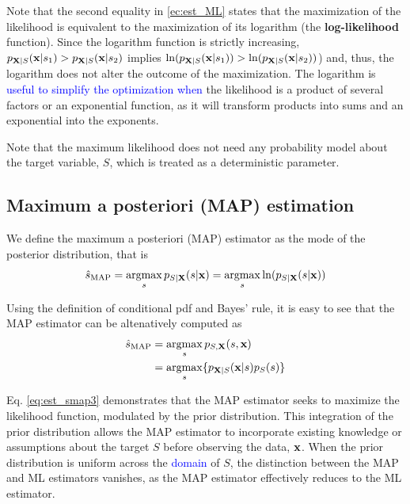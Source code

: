 Note that the second equality in \eqref{ec:est_ML} states that the maximization of the likelihood is equivalent to the maximization of its logarithm (the \textbf{log-likelihood} function). Since the logarithm function is strictly increasing, $p_{{\bf X}|S}({\bf x}|s_1) > p_{{\bf X}|S}({\bf x}|s_2)$ implies $\ln(p_{{\bf X}|S}({\bf x}|s_1)) > \ln(p_{{\bf X}|S}({\bf x}|s_2))$) and, thus, the logarithm does not alter the outcome of the maximization. The logarithm is \textcolor{blue}{useful to simplify the optimization when} the likelihood is a product of several factors or an exponential function, as it will transform products into sums and an exponential into the exponents. 

Note that the maximum likelihood does not need any probability model about the target variable, $S$, which is treated as a deterministic parameter.


\subsection{Maximum a posteriori (MAP) estimation}

We define the maximum a posteriori (MAP) estimator as the mode of the posterior distribution, that is
\begin{equation}
\hat s_{\text{MAP}} = \operatorname*{argmax}_{s} p_{{S|\bf X}}(s|{\bf x})
                    = \operatorname*{argmax}_{s} \ln(p_{{S|\bf X}}(s|{\bf x}))
                   \label{ec:est_MAP}
\end{equation}

Using the definition of conditional pdf and Bayes' rule, it is easy to see that the MAP estimator can be altenatively computed as
\begin{align}
\label{eq:est_smap2}
\hat s_{\text{MAP}} 
	&= \operatorname*{argmax}_{s} p_{{S,\bf X}}(s,{\bf x})   \\
\label{eq:est_smap3}
    &= \operatorname*{argmax}_{s} \{p_{{\bf X}|S}({\bf x}|s) p_S(s)\}
\end{align}

Eq. \eqref{eq:est_smap3} demonstrates that the MAP estimator seeks to maximize the likelihood function, modulated by the prior distribution. This integration of the prior distribution allows the MAP estimator to incorporate existing knowledge or assumptions about the target $S$ before observing the data, ${\bf x}$. When the prior distribution is uniform across the \textcolor{blue}{domain} of $S$, the distinction between the MAP and ML estimators vanishes, as the MAP estimator effectively reduces to the ML estimator.


